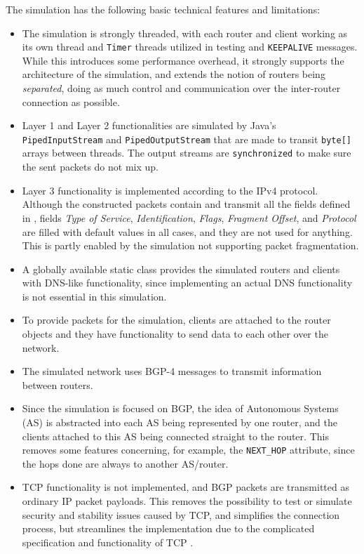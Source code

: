 \documentclass[11pt,a4paper,titlepage]{report}
\begin{document}
The simulation has the following basic technical features and limitations:
\begin{itemize}
\item The simulation is strongly threaded, with each router and client working as its own thread and \texttt{Timer} threads utilized in testing and \texttt{KEEPALIVE} messages. While this introduces some performance overhead, it strongly supports the architecture of the simulation, and extends the notion of routers being \emph{separated}, doing as much control and communication over the inter-router connection as possible.
\item Layer 1 and Layer 2 functionalities are simulated by Java's \texttt{PipedInputStream} and \texttt{PipedOutputStream} that are made to transit \texttt{byte[]} arrays between threads. The output streams are \texttt{synchronized} to make sure the sent packets do not mix up.
\item Layer 3 functionality is implemented according to the IPv4 protocol. Although the constructed packets contain and transmit all the fields defined in \cite{RFC0791}, fields \emph{Type of Service}, \emph{Identification}, \emph{Flags}, \emph{Fragment Offset}, and \emph{Protocol} are filled with default values in all cases, and they are not used for anything. This is partly enabled by the simulation not supporting packet fragmentation.
\item A globally available static class provides the simulated routers and clients with DNS-like functionality, since implementing an actual DNS functionality is not essential in this simulation.
\item To provide packets for the simulation, clients are attached to the router objects and they have functionality to send data to each other over the network.
\item The simulated network uses BGP-4 messages to transmit information between routers.
\item Since the simulation is focused on BGP, the idea of Autonomous Systems (AS) is abstracted into each AS being represented by one router, and the clients attached to this AS being connected straight to the router. This removes some features concerning, for example, the \texttt{NEXT\_HOP} attribute, since the hops done are always to another AS/router.
\item TCP functionality is not implemented, and BGP packets are transmitted as ordinary IP packet payloads. This removes the possibility to test or simulate security and stability issues caused by TCP, and simplifies the connection process, but streamlines the implementation due to the complicated specification and functionality of TCP \cite{RFC0793}.

\end{itemize}
\end{document}
